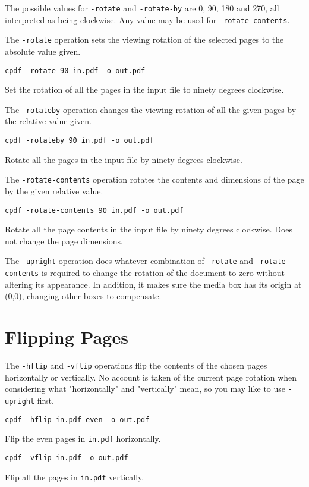 \documentclass{book}
\begin{document}
  The possible values for \texttt{-rotate} and \texttt{-rotate-by} are 0, 90,
180 and 270, all interpreted as being clockwise. Any value may be used for
\texttt{-rotate-contents}.
  
The \texttt{-rotate} operation sets the viewing rotation of the selected pages to
the absolute value given.
  \begin{framed}
  \small\verb!cpdf -rotate 90 in.pdf -o out.pdf!

  \vspace{2.5mm}
  \noindent Set the rotation of all the pages in the input file to ninety degrees clockwise.
  \end{framed}
  \noindent The \texttt{-rotateby} operation changes the viewing rotation of all the
given pages by the relative value given.
  \begin{framed}
  \small\verb!cpdf -rotateby 90 in.pdf -o out.pdf!

  \vspace{2.5mm}
  \noindent Rotate all the pages in the input file by ninety degrees clockwise.
  \end{framed}
  \noindent The \texttt{-rotate-contents} operation rotates the contents and dimensions
of the page by the given relative value.
  \begin{framed}
  \small\verb!cpdf -rotate-contents 90 in.pdf -o out.pdf!

  \vspace{2.5mm}

  \noindent Rotate all the page contents in the input file by
ninety degrees clockwise. Does not change the page dimensions.
  \end{framed}

  \label{upright}
   \noindent The \texttt{-upright} operation does whatever combination of
\texttt{-rotate} and \texttt{-rotate-contents} is required to change the
rotation of the document to zero without altering its appearance. In addition, it makes sure the media box has its origin at (0,0), changing other boxes to compensate.

  \section{Flipping Pages}
  The \texttt{-hflip} and \texttt{-vflip} operations flip the contents of the
chosen pages horizontally or vertically. No account is taken of the current
page rotation when considering what "horizontally" and "vertically" mean, so you may like to use \texttt{-upright} first.
  \begin{framed}
    \small\verb!cpdf -hflip in.pdf even -o out.pdf!

    \vspace{2.5mm}
    \noindent Flip the even pages in \texttt{in.pdf} horizontally.

    \vspace{2.5mm}
    \verb!cpdf -vflip in.pdf -o out.pdf!

    \vspace{2.5mm}
    \noindent Flip all the pages in \texttt{in.pdf} vertically.
  \end{framed}
\end{document}
